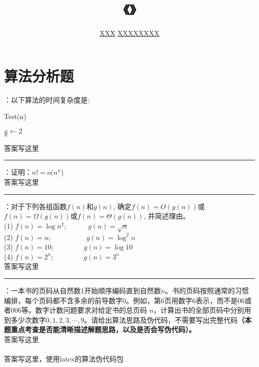 \documentclass[UTF8,16pt]{article} %
\title{《\heiti{算法设计与分析}》\heiti{第{\color{red}1}次作业}}
\author{\kaishu{姓名：}\underline{XXX} \quad\quad\quad\quad\quad  \kaishu{学号：}\underline{XXXXXXXX}}
\date{}
\begin{document}
	
\maketitle
\vbox{} %

\section*{\textbf{算法分析题}}
：以下算法的时间复杂度是:
\begin{algorithm}[htb]
    \SetAlgoNoLine
    \caption{Test(n)}
   $x\gets 2$\\
   \Return $x$
\end{algorithm}


\noindent
{}{答案写这里}\\
\rule[0pt]{14.3cm}{0.05em}


\vbox{} %
：证明：$n!=o(n^{n}$)\\
{}{答案写这里}\\
\rule[0pt]{14.3cm}{0.05em}

\vbox{} %
：对于下列各组函数$f(n)$和$g(n)$, 确定$f(n)=O(g(n))$或$f(n)=\Omega(g(n))$或$f(n)=\Theta(g(n))$, 并简述理由。\\
(1) $f(n)=\log n^2;\quad\quad\quad g(n)=\sqrt{n}$\\
(2) $f(n)=n;\quad\quad\quad\quad\quad g(n)=\log^{2}n$\\
(3) $f(n)=10;\quad\quad\quad\quad\ g(n)=\log10$\\
(4) $f(n)=2^n;\quad\quad\quad\quad\ g(n)=3^n$\\
{}{答案写这里}\\
\rule[0pt]{14.3cm}{0.05em}


\vbox{} %
：一本书的页码从自然数1开始顺序编码直到自然数$n$。书的页码按照通常的习惯编排，每个页码都不含多余的前导数字0。例如，第6页用数字6表示，而不是06或者006等。数字计数问题要求对给定书的总页码 $n$，计算出书的全部页码中分别用到多少次数字$0,1,2,3,\cdots,9$。请给出算法思路及伪代码，不需要写出完整代码{\bf（本题重点考查是否能清晰描述解题思路，以及是否会写伪代码）。}\\
{}{答案写这里}\\
{}\\
{答案写这里，使用latex的算法伪代码包}\\
\end{document}
